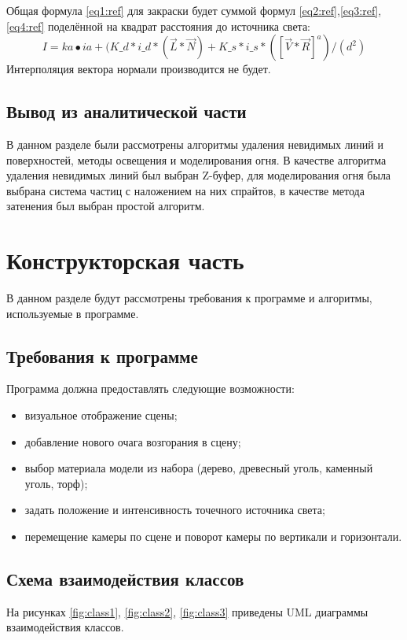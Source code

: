 \documentclass[a4paper,14pt]{report}
\begin{document}
Общая формула \ref{eq1:ref} для закраски будет суммой формул \ref{eq2:ref},\ref{eq3:ref}, \ref{eq4:ref} поделённой на квадрат расстояния до источника света:
\begin{equation}
I= ka • ia +  (K\_d* i\_d*(\vec{L} * \vec{N} )+ K\_s* i\_s*([\vec{V} * \vec{R}]^a)/(d^2)   
\label{eq1:ref}                  
\end{equation}
Интерполяция вектора нормали производится не будет.

\section*{Вывод из аналитической части}
В данном разделе были рассмотрены алгоритмы удаления невидимых линий и поверхностей, методы освещения и моделирования огня. В качестве алгоритма удаления невидимых линий был выбран Z-буфер, для моделирования огня была выбрана система частиц с наложением на них спрайтов, в качестве метода затенения был выбран простой алгоритм.

\chapter{Конструкторская часть}
В данном разделе будут рассмотрены требования к программе и
алгоритмы, используемые в программе.


\section{Требования к программе}
Программа должна предоставлять следующие возможности:
\begin{itemize}
\item визуальное отображение сцены;
\item добавление нового очага возгорания в сцену;
\item выбор материала модели из набора (дерево, древесный уголь, каменный уголь, торф);
\item задать положение и интенсивность точечного источника света;
\item перемещение камеры по сцене и поворот камеры по вертикали и горизонтали.
\end{itemize}
\section{Схема взаимодействия классов}
На рисунках \ref{fig:class1}, \ref{fig:class2}, \ref{fig:class3} приведены UML диаграммы взаимодействия классов.
\end{document}
